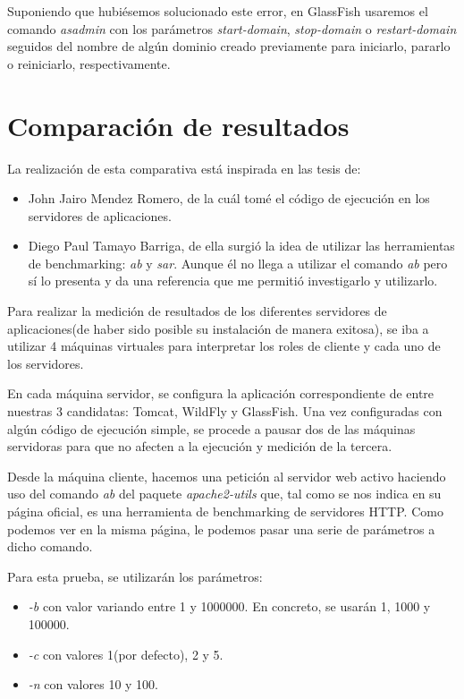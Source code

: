\documentclass[a4paper, 10pt]{article}
\begin{document}
		Suponiendo que hubiésemos solucionado este error, en GlassFish usaremos el comando
		\textit{asadmin} con los parámetros \textit{start-domain}, \textit{stop-domain} o
		\textit{restart-domain} seguidos del nombre de algún dominio creado previamente
		para iniciarlo, pararlo o reiniciarlo, respectivamente.

\section{Comparación de resultados}
	La realización de esta comparativa está inspirada en las tesis de:
		\begin{itemize}
			\item John Jairo Mendez Romero\cite{JJMR_Tesis}, de la cuál tomé el código de
			ejecución en los servidores de aplicaciones.
			
			\item Diego Paul Tamayo Barriga\cite{DPTB_Tesis}, de ella surgió la idea de utilizar
			las herramientas de benchmarking: \textit{ab} y \textit{sar}. Aunque él no llega a
			utilizar el comando \textit{ab} pero sí lo presenta y da una referencia que me
			permitió investigarlo y utilizarlo.
		\end{itemize}

	Para realizar la medición de resultados de los diferentes servidores de aplicaciones(de haber
	sido posible su instalación de manera exitosa), se iba a utilizar 4 máquinas virtuales para
	interpretar los roles de cliente y cada uno de los servidores.
	
	En cada máquina servidor, se configura la aplicación correspondiente de entre nuestras 3 
	candidatas: Tomcat, WildFly y GlassFish. Una vez configuradas con algún código de ejecución
	simple, se procede a pausar dos de las máquinas servidoras para que no afecten a la ejecución
	y medición de la tercera.
	
	Desde la máquina cliente, hacemos una petición al servidor web activo haciendo uso del comando
	\textit{ab} del paquete \textit{apache2-utils} que, tal como se nos indica en su página
	oficial\cite{AB_official}, es una herramienta de benchmarking de servidores HTTP. Como podemos
	 ver en la misma página, le podemos pasar una serie de parámetros a dicho comando.
	
	Para esta prueba, se utilizarán los parámetros:
	\begin{itemize}
		\item \textit{-b} con valor variando entre 1 y 1000000. En concreto, se usarán 1, 1000 y 100000.
		\item \textit{-c} con valores 1(por defecto), 2 y 5.
		\item \textit{-n} con valores 10 y 100.
	\end{itemize}
	
\end{document}
